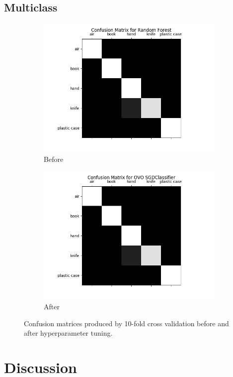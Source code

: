 \documentclass[12pt]{article}
\begin{document}
\subsection{Multiclass}
\begin{figure}[!ht]
\centering
\begin{subfigure}{.5\textwidth}
  \centering
  \includegraphics[width=\linewidth]{images/mctestrf}
	\caption{Before}
  \label{fig:mcrf}
\end{subfigure}%
\begin{subfigure}{.5\textwidth}
  \centering
  \includegraphics[width=\linewidth]{images/mctestsgd}
  \caption{After}
  \label{fig:mcsgd}
\end{subfigure}
\caption{Confusion matrices produced by 10-fold cross validation before and after hyperparameter tuning.}
\label{fig:testmulticlass}
\end{figure}

\section{Discussion}



\end{document}
